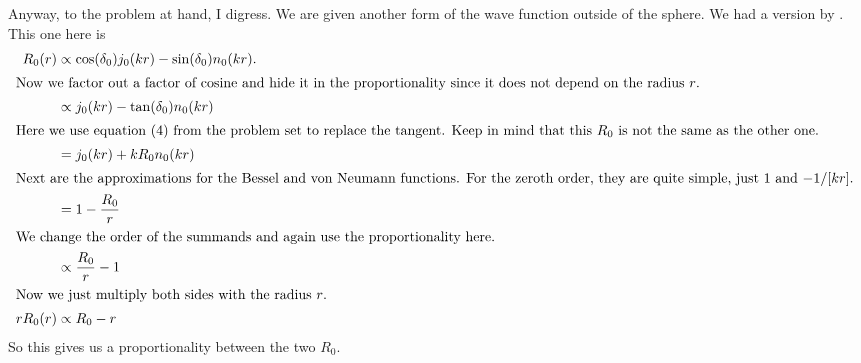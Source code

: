 \documentclass[11pt, english, fleqn, DIV=15, headinclude, BCOR=1.5cm]{scrartcl}
\begin{document}
Anyway, to the problem at hand, I digress. We are given another form of the
wave function outside of the sphere. We had a version by
\citeauthor{Schwabl/Quantenmechanik}. This one here is
\begin{align*}
    R_0(r)
    &\propto \cos(\delta_0) j_0(kr) - \sin(\delta_0) n_0(kr). \\
    \intertext{%
        Now we factor out a factor of cosine and hide it in the
        proportionality since it does not depend on the radius $r$.
    }
    &\propto j_0(kr) - \tan(\delta_0) n_0(kr) \\
    \intertext{%
        Here we use equation~(4) from the problem set to replace the tangent.
        Keep in mind that this $R_0$ is not the same as the other one.
    }
    &= j_0(kr) + k R_0 n_0(kr) \\
    \intertext{%
        Next are the approximations for the Bessel and von~Neumann functions.
        For the zeroth order, they are quite simple, just $1$ and $-1/[kr]$.
    }
    &= 1 - \frac{R_0}r  \\
    \intertext{%
        We change the order of the summands and again use the proportionality
        here.
    }
    &\propto \frac{R_0}r - 1 \\
    \intertext{%
        Now we just multiply both sides with the radius $r$.
    }
    r R_0(r) &\propto R_0 - r
\end{align*}
So this gives us a proportionality between the two $R_0$.
\end{document}
